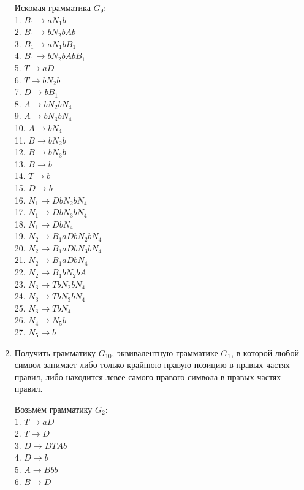 \documentclass[a4paper,14pt]{extarticle}
\begin{document}
\begin{enumerate}[1.]
Искомая грамматика $G_9$:\\
1. $B_1 \rightarrow aN_1b$\\
2. $B_1 \rightarrow bN_2bAb$\\
3. $B_1 \rightarrow aN_1bB_1$\\
4. $B_1 \rightarrow bN_2bAbB_1$\\
5. $T \rightarrow aD$\\ 
6. $T \rightarrow bN_2b$\\
7. $D \rightarrow bB_1$\\
8. $A \rightarrow bN_2bN_4$\\
9. $A \rightarrow bN_3bN_4$\\
10. $A \rightarrow bN_4$\\
11. $B \rightarrow bN_2b$\\ 
12. $B \rightarrow bN_3b$\\ 
13. $B \rightarrow b$\\
14. $T \rightarrow b$\\
15. $D \rightarrow b$\\
16. $N_1 \rightarrow DbN_2bN_4$\\
17. $N_1 \rightarrow DbN_3bN_4$\\
18. $N_1 \rightarrow DbN_4$\\
19. $N_2 \rightarrow B_1aDbN_2bN_4$\\
20. $N_2 \rightarrow B_1aDbN_3bN_4$\\
21. $N_2 \rightarrow B_1aDbN_4$\\
22. $N_2 \rightarrow B_1bN_2bA$\\
23. $N_3 \rightarrow TbN_2bN_4$\\
24. $N_3 \rightarrow TbN_3bN_4$\\
25. $N_3 \rightarrow TbN_4$\\
26. $N_4 \rightarrow N_5b$\\
27. $N_5 \rightarrow b$\\

\item Получить грамматику $G_{10}$, эквивалентную грамматике $G_1$, в которой
любой символ занимает либо только крайнюю правую позицию в правых частях правил, 
либо находится левее самого правого символа в правых частях правил.

Возьмём грамматику $G_2$:\\
1. $T \rightarrow aD$\\
2. $T \rightarrow D$\\
3. $D \rightarrow DTAb$\\
4. $D \rightarrow b$\\
5. $A \rightarrow Bbb$\\
6. $B \rightarrow D$\\


\end{enumerate}
\end{document}
